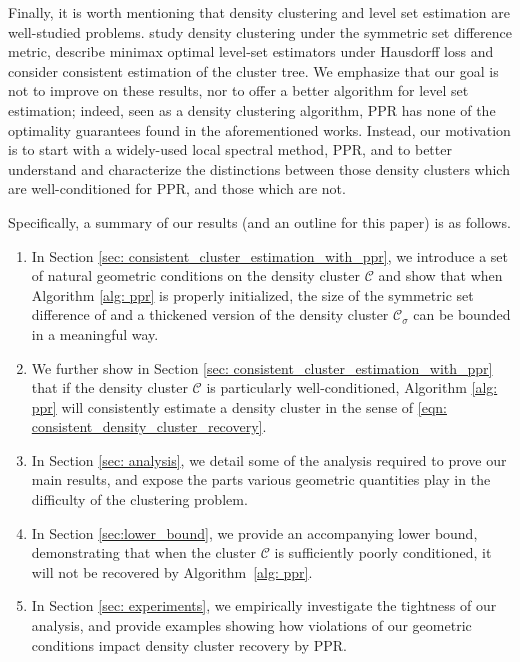 \documentclass[11pt,twoside]{article}
\newcommand{\1}{\mathbf{1}}
\newcommand{\Cset}{\mathcal{C}}
\newcommand{\Csig}{\Cset_{\sigma}}
\newcommand{\Cest}{\widehat{C}}
\begin{document}
Finally, it is worth mentioning that density clustering and level set estimation are well-studied problems. \citet{polonik1995, rigollet2009} study density clustering under the 
symmetric set difference metric, \citet{tsybakov1997, singh2009} describe
minimax optimal level-set estimators under Hausdorff loss and
\citet{hartigan1981, chaudhuri2010, balakrishnan2013} consider consistent estimation of the
cluster tree.
We emphasize that our goal is not to improve on these
results, nor to offer a better algorithm for level set estimation; indeed, seen as
a density clustering algorithm, PPR has none of the optimality guarantees 
found in the aforementioned works. Instead, our motivation is to start with a 
widely-used local spectral method, PPR, and to better understand and
characterize the distinctions between those density clusters which are
well-conditioned for PPR, and those which are not. 


Specifically, a summary of our results (and an outline for this
paper) is as follows.

\begin{enumerate}
\item In Section \ref{sec: consistent_cluster_estimation_with_ppr}, we introduce
  a set of natural geometric conditions on the density cluster $\Cset$
  and show that when Algorithm \ref{alg: ppr} is properly initialized, the size of
  the symmetric set difference of \smash{$\Cest$} and a thickened version of the
  density cluster $\Csig$ can be bounded in a meaningful way.
	
\item We further show in Section \ref{sec:
    consistent_cluster_estimation_with_ppr} that if the density cluster 
  $\Cset$ is particularly well-conditioned, Algorithm \ref{alg: ppr}
  will consistently estimate a density cluster in the sense of
  \eqref{eqn: consistent_density_cluster_recovery}. 
	
\item In Section \ref{sec: analysis}, we detail some of the analysis required to
  prove our main results, and expose the parts various geometric quantities play 
  in the difficulty of the clustering problem. 
  
\item In Section \ref{sec:lower_bound}, we provide an accompanying lower bound, demonstrating that when the cluster $\Cset$ is sufficiently poorly conditioned, it will not be recovered by Algorithm~\ref{alg: ppr}.
	
\item In Section \ref{sec: experiments}, we empirically investigate the
  tightness of our analysis, and provide examples showing how violations of our
  geometric conditions impact density cluster recovery by PPR.
\end{enumerate}
\end{document}
